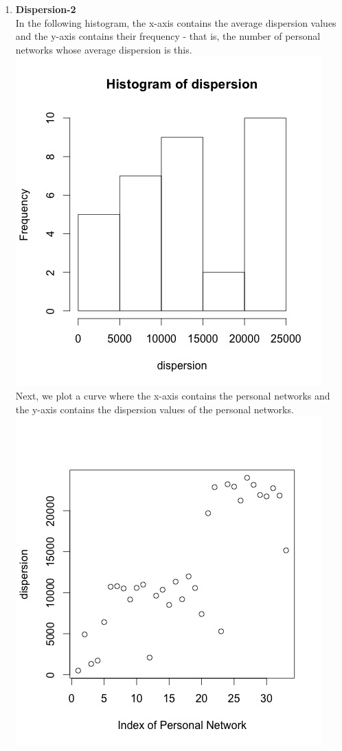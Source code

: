 \documentclass{article}
\begin{document}
\begin{enumerate}
 \item \textbf{Dispersion-2}\\
 In the following histogram, the x-axis contains the average dispersion values and the y-axis contains their
 frequency - that is, the number of personal networks whose average dispersion is this.\\
 \includegraphics[scale=0.4]{5-e} \\
 Next, we plot a curve where the x-axis contains the personal networks and the y-axis contains the dispersion
 values of the personal networks.\\
 \includegraphics[scale=0.4]{5-f} \\
 
 \end{enumerate}
\end{document}
